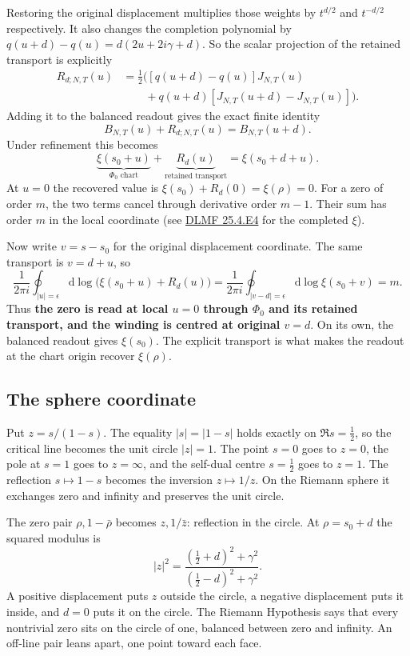 \documentclass[11pt]{article}
\begin{document}
Restoring the original displacement multiplies those weights by \(t^{d/2}\) and \(t^{-d/2}\) respectively. It also changes the completion polynomial by \(q(u+d)-q(u)=d(2u+2i\gamma+d)\). So the scalar projection of the retained transport is explicitly
\[
\begin{aligned}
R_{d;N,T}(u)
&=\frac12\Big([q(u+d)-q(u)]J_{N,T}(u)\\
&\qquad +q(u+d)[J_{N,T}(u+d)-J_{N,T}(u)]\Big).
\end{aligned}
\]
Adding it to the balanced readout gives the exact finite identity
\[
B_{N,T}(u)+R_{d;N,T}(u)=B_{N,T}(u+d).
\]
Under refinement this becomes
\[
\boxed{\underbrace{\xi(s_0+u)}_{\Phi_0\text{ chart}}+
       \underbrace{R_d(u)}_{\text{retained transport}}
       =\xi(s_0+d+u).}
\]
At \(u=0\) the recovered value is \(\xi(s_0)+R_d(0)=\xi(\rho)=0\). For a zero of order \(m\), the two terms cancel through derivative order \(m-1\). Their sum has order \(m\) in the local coordinate (see \href{https://dlmf.nist.gov/25.4.E4}{DLMF 25.4.E4} for the completed \(\xi\)).

Now write \(v=s-s_0\) for the original displacement coordinate. The same transport is \(v=d+u\), so
\[
\frac1{2\pi i}\oint_{|u|=\epsilon}
\mathrm{d}\log\!\bigl(\xi(s_0+u)+R_d(u)\bigr)
=
\frac1{2\pi i}\oint_{|v-d|=\epsilon}\mathrm{d}\log\xi(s_0+v)
=m.
\]
Thus \textbf{the zero is read at local \(u=0\) through \(\Phi_0\) and its retained transport, and the winding is centred at original \(v=d\)}. On its own, the balanced readout gives \(\xi(s_0)\). The explicit transport is what makes the readout at the chart origin recover \(\xi(\rho)\).

\subsection{The sphere coordinate}

Put \(z=s/(1-s)\). The equality \(|s|=|1-s|\) holds exactly on \(\Re s=\tfrac12\), so the critical line becomes the unit circle \(|z|=1\). The point \(s=0\) goes to \(z=0\), the pole at \(s=1\) goes to \(z=\infty\), and the self-dual centre \(s=\tfrac12\) goes to \(z=1\). The reflection \(s\mapsto1-s\) becomes the inversion \(z\mapsto1/z\). On the Riemann sphere it exchanges zero and infinity and preserves the unit circle.

The zero pair \(\rho,1-\bar\rho\) becomes \(z,1/\bar z\): reflection in the circle. At \(\rho=s_0+d\) the squared modulus is
\[
|z|^2=\frac{(\tfrac12+d)^2+\gamma^2}{(\tfrac12-d)^2+\gamma^2}.
\]
A positive displacement puts \(z\) outside the circle, a negative displacement puts it inside, and \(d=0\) puts it on the circle. The Riemann Hypothesis says that every nontrivial zero sits on the circle of one, balanced between zero and infinity. An off-line pair leans apart, one point toward each face.
\end{document}
